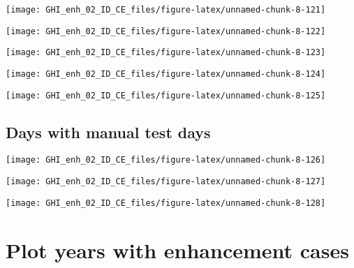 \documentclass[
  10pt,
  a4paper,oneside]{article}
\begin{document}
\begin{center}\texttt{[image: GHI\_enh\_02\_ID\_CE\_files/figure-latex/unnamed-chunk-8-121]} \end{center}

\begin{center}\texttt{[image: GHI\_enh\_02\_ID\_CE\_files/figure-latex/unnamed-chunk-8-122]} \end{center}

\begin{center}\texttt{[image: GHI\_enh\_02\_ID\_CE\_files/figure-latex/unnamed-chunk-8-123]} \end{center}

\begin{center}\texttt{[image: GHI\_enh\_02\_ID\_CE\_files/figure-latex/unnamed-chunk-8-124]} \end{center}

\begin{center}\texttt{[image: GHI\_enh\_02\_ID\_CE\_files/figure-latex/unnamed-chunk-8-125]} \end{center}

\FloatBarrier

\hypertarget{days-with-manual-test-days}{%
\subsection{Days with manual test days}\label{days-with-manual-test-days}}

\begin{center}\texttt{[image: GHI\_enh\_02\_ID\_CE\_files/figure-latex/unnamed-chunk-8-126]} \end{center}

\begin{center}\texttt{[image: GHI\_enh\_02\_ID\_CE\_files/figure-latex/unnamed-chunk-8-127]} \end{center}

\begin{center}\texttt{[image: GHI\_enh\_02\_ID\_CE\_files/figure-latex/unnamed-chunk-8-128]} \end{center}

\newpage
\FloatBarrier

\hypertarget{plot-years-with-enhancement-cases}{%
\section{Plot years with enhancement cases}\label{plot-years-with-enhancement-cases}}
\end{document}
